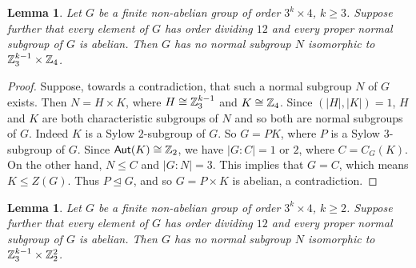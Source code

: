 \documentclass{amsart}
\newtheorem{lem}[thm]{Lemma}
\def \leq {\leqslant}
\def \geq {\geqslant}
\def\Aut{{\sf Aut}} \def\Inn{{\sf Inn}}\def\Core{{\sf Core}}
\begin{document}
\begin{lem}\label{3k-14}
	Let $G$ be a finite non-abelian group of order $3^k\times 4$, $k\geq 3$. Suppose further that every element of $G$ has order dividing $12$ and every proper normal subgroup of $G$ is abelian. Then $G$
	has no normal subgroup $N$ isomorphic to $\Bbb Z_3^{k-1}\times\Bbb Z_4$.
\end{lem}
\begin{proof}
	Suppose, towards a contradiction, that such a normal subgroup $N$ of $G$ exists. Then $N=H\times K$, where $H\cong\Bbb Z_3^{k-1}$ and $K\cong\Bbb Z_4$. Since $(|H|,|K|)=1$, $H$ and $K$ are both characteristic subgroups of $N$ and so both are normal subgroups of $G$. Indeed $K$ is a Sylow $2$-subgroup of $G$. So $G=PK$, where $P$ is a Sylow $3$-subgroup of $G$. Since $\Aut(K)\cong\Bbb Z_2$, we have $|G:C|=1$ or $2$, where $C=C_G(K)$. On the other hand, $N\leq C$ and $|G:N|=3$. This implies that $G=C$, which means $K\leq Z(G)$. Thus $P\unlhd G$, and so $G=P\times K$ is abelian, a contradiction.
\end{proof}
\begin{lem}\label{3k-122}
	Let $G$ be a finite non-abelian group of order $3^k\times 4$, $k\geq 2$. Suppose further that every element of $G$ has order dividing $12$ and every proper normal subgroup of $G$ is abelian. Then $G$
	has no normal subgroup $N$ isomorphic to $\Bbb Z_3^{k-1}\times\Bbb Z_2^2$.
\end{lem}
\end{document}
